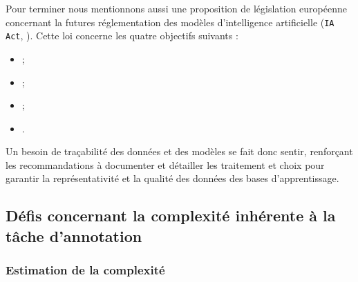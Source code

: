 			\begin{leftBarInformation}
				Pour terminer nous mentionnons aussi une proposition de législation européenne concernant la futures réglementation des modèles d'intelligence artificielle (\texttt{IA Act}, \cite{european-commission:2021:proposal-regulation-european}).
				Cette loi concerne les quatre objectifs suivants :
				\begin{itemize}
					\item {} ;
					\item {} ;
					\item {} ;
					\item {}.
				\end{itemize}
				Un besoin de traçabilité des données et des modèles se fait donc sentir, renforçant les recommandations à documenter et détailler les traitement et choix pour garantir la représentativité et la qualité des données des bases d'apprentissage.
			\end{leftBarInformation}
		
		
	\subsection{Défis concernant la complexité inhérente à la tâche d'annotation}
	\label{section:2.3.2-DEFIS-ANNOTATION-ASPECT-COMPLEXITE}
		
		\subsubsection{Estimation de la complexité}
		\label{section:2.3.2.A-DEFIS-ANNOTATION-ASPECT-COMPLEXITE-ESTIMATION}
		
